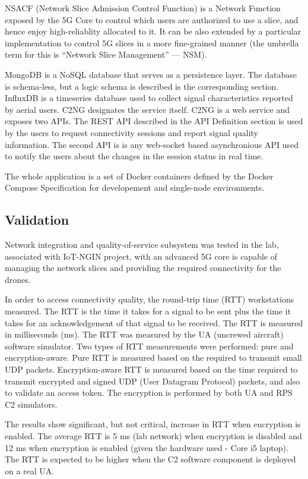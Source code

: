 \documentclass[a4paper,conference]{IEEEtran}
\begin{document}
NSACF (Network Slice Admission Control Function) is a Network Function exposed by the 5G Core to control which users are authorized to use a slice, and hence enjoy high-reliablity allocated to it. It can be also extended by a particular implementation to control 5G slices in a more fine-grained manner (the umbrella term for this is “Network Slice Management” --- NSM).

MongoDB is a NoSQL database that serves as a persistence layer. The database is schema-less, but a logic schema is described is the corresponding section. InfluxDB is a timeseries database used to collect signal characteristics reported by aerial users. C2NG designates the service itself. C2NG is a web service and exposes two APIs. The REST API described in the API Definition section is used by the users to request connectivity sessions and report signal quality information. The second API is is any web-socket based asynchronious API used to notify the users about the changes in the session status in real time.

The whole application is a set of Docker containers defined by the Docker Compose Specification for developement and single-node environments.

\subsection{Validation}

Network integration and quality-of-service subsystem was tested in the lab, associated with IoT-NGIN project, with an advanced 5G core is capable of managing the network slices and providing the required connectivity for the drones.

In order to access connectivity quality, the round-trip time (RTT) workstations measured. The RTT is the time it takes for a signal to be sent plus the time it takes for an acknowledgement of that signal to be received. The RTT is measured in milliseconds (ms). The RTT was measured by the UA (uncrewed aircraft) software simulator. Two types of RTT measurements were performed: pure and encryption-aware. Pure RTT is measured based on the required to transmit small UDP packets. Encryption-aware RTT is measured based on the time required to transmit encrypted and signed UDP (User Datagram Protocol) packets, and also to validate an access token. The encryption is performed by both UA and RPS C2 simulators.

The results show significant, but not critical, increase in RTT when encryption is enabled. The average RTT is 5 ms (lab network) when encryption is disabled and 12 ms when encryption is enabled (given the hardware used - Core i5 laptop). The RTT is expected to be higher when the C2 software component is deployed on a real UA.
\end{document}
